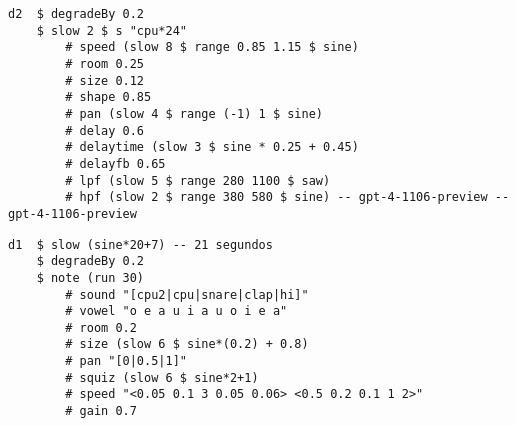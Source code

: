 \begin{minipage}[t]{1\textwidth}
    \centering
    \begin{lstlisting}[style=SuperCollider-IDE, language=ExtendedHaskell, basicstyle=\footnotesize\ttfamily, numbers=none]
d2  $ degradeBy 0.2 
    $ slow 2 $ s "cpu*24" 
        # speed (slow 8 $ range 0.85 1.15 $ sine) 
        # room 0.25 
        # size 0.12 
        # shape 0.85 
        # pan (slow 4 $ range (-1) 1 $ sine) 
        # delay 0.6 
        # delaytime (slow 3 $ sine * 0.25 + 0.45) 
        # delayfb 0.65 
        # lpf (slow 5 $ range 280 1100 $ saw) 
        # hpf (slow 2 $ range 380 580 $ sine) -- gpt-4-1106-preview -- gpt-4-1106-preview  
    \end{lstlisting}
    \vspace{1cm}
\end{minipage}






\begin{minipage}[t]{1\textwidth}
    \centering
    \begin{lstlisting}[style=SuperCollider-IDE, language=ExtendedHaskell, basicstyle=\footnotesize\ttfamily, numbers=none]
d1  $ slow (sine*20+7) -- 21 segundos
    $ degradeBy 0.2
    $ note (run 30) 
        # sound "[cpu2|cpu|snare|clap|hi]" 
        # vowel "o e a u i a u o i e a" 
        # room 0.2
        # size (slow 6 $ sine*(0.2) + 0.8) 
        # pan "[0|0.5|1]"
        # squiz (slow 6 $ sine*2+1) 
        # speed "<0.05 0.1 3 0.05 0.06> <0.5 0.2 0.1 1 2>" 
        # gain 0.7
    \end{lstlisting}
    \vspace{1cm}
\end{minipage}